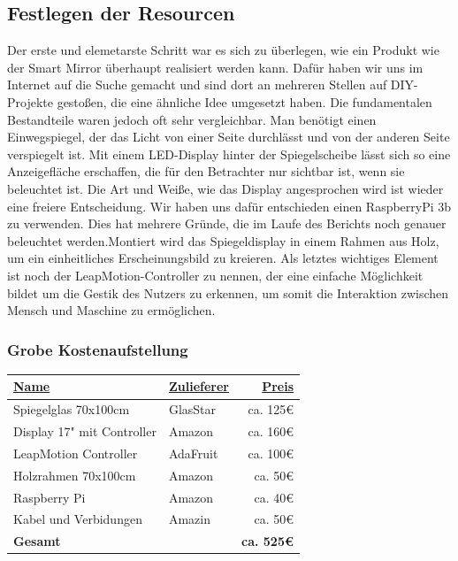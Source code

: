 \documentclass[12pt, a4paper]{scrartcl}
\begin{document}
	\subsection{Festlegen der Resourcen}
	Der erste und elemetarste Schritt war es sich zu überlegen, wie ein Produkt wie der Smart Mirror überhaupt realisiert werden kann. Dafür haben wir uns im Internet auf die Suche gemacht und sind dort an mehreren Stellen auf DIY-Projekte gestoßen, die eine ähnliche Idee umgesetzt haben. Die fundamentalen Bestandteile waren jedoch oft sehr vergleichbar. Man benötigt einen Einwegspiegel, der das Licht von einer Seite durchlässt und von der anderen Seite verspiegelt ist. Mit einem LED-Display hinter der Spiegelscheibe lässt sich so eine Anzeigefläche erschaffen, die für den Betrachter nur sichtbar ist, wenn sie beleuchtet ist. Die Art und Weiße, wie das Display angesprochen wird ist wieder eine freiere Entscheidung. Wir haben uns dafür entschieden einen RaspberryPi 3b zu verwenden. Dies hat mehrere Gründe, die im Laufe des Berichts noch genauer beleuchtet werden.Montiert wird das Spiegeldisplay in einem Rahmen aus Holz, um ein einheitliches Erscheinungsbild zu kreieren. Als letztes wichtiges Element ist noch der LeapMotion-Controller zu nennen, der eine einfache Möglichkeit bildet um die Gestik des Nutzers zu erkennen, um somit die Interaktion zwischen Mensch und Maschine zu ermöglichen.
	
	\subsubsection*{Grobe Kostenaufstellung}
	\begin{tabularx}{0.95\textwidth}{|X|l|r|}
		\hline
		\textcolor{tumbleweed}{\underline{\textbf{Name}}} & \textcolor{tumbleweed}{\underline{\textbf{Zulieferer}}} & \textcolor{tumbleweed}{\underline{\textbf{Preis}}}\\
		\hline
		Spiegelglas 70x100cm & GlasStar&ca. 125\euro\\
		\hline
		Display 17" mit Controller & Amazon & ca. 160\euro\\
		\hline
		LeapMotion Controller & AdaFruit & ca. 100\euro \\
		\hline
		Holzrahmen 70x100cm & Amazon & ca. 50\euro\\
		\hline
		Raspberry Pi & Amazon & ca. 40\euro\\
		\hline
		Kabel und Verbidungen & Amazin & ca. 50\euro\\
		\hline
		\textcolor{tumbleweed}{\textbf{Gesamt}}& & \textbf{ca. 525\euro}\\
		\hline
	\end{tabularx}
\end{document}

